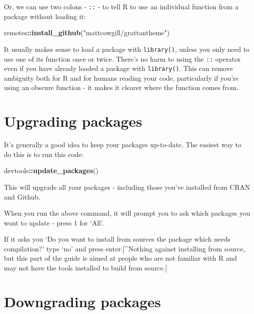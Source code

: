 \documentclass[]{book}
\newenvironment{Shaded}{\begin{snugshade}}{\end{snugshade}}
\newcommand{\KeywordTok}[1]{\textcolor[rgb]{0.13,0.29,0.53}{\textbf{#1}}}
\newcommand{\NormalTok}[1]{#1}
\newcommand{\OperatorTok}[1]{\textcolor[rgb]{0.81,0.36,0.00}{\textbf{#1}}}
\newcommand{\StringTok}[1]{\textcolor[rgb]{0.31,0.60,0.02}{#1}}
\begin{document}
Or, we can use two colons - \texttt{::} - to tell R to use an individual function from a package without loading it:

\begin{Shaded}
\begin{Highlighting}[]
\NormalTok{remotes}\OperatorTok{::}\KeywordTok{install_github}\NormalTok{(}\StringTok{"mattcowgill/grattantheme"}\NormalTok{)}
\end{Highlighting}
\end{Shaded}

It usually makes sense to load a package with \texttt{library()}, unless you only need to use one of its function once or twice. There's no harm to using the \texttt{::} operator even if you have already loaded a package with \texttt{library()}. This can remove ambiguity both for R and for humans reading your code, particularly if you're using an obscure function - it makes it clearer where the function comes from.

\hypertarget{upgrading-packages}{%
\section{Upgrading packages}\label{upgrading-packages}}

It's generally a good idea to keep your packages up-to-date. The easiest way to do this is to run this code:

\begin{Shaded}
\begin{Highlighting}[]
\NormalTok{devtools}\OperatorTok{::}\KeywordTok{update_packages}\NormalTok{()}
\end{Highlighting}
\end{Shaded}

This will upgrade all your packages - including those you've installed from CRAN and Github.

When you run the above command, it will prompt you to ask which packages you want to update - press 1 for `All'.

If it asks you `Do you want to install from sources the package which needs compilation?' type `no' and press enter.{[}\^{}Nothing against installing from source, but this part of the guide is aimed at people who are not familiar with R and may not have the tools installed to build from source.{]}

\hypertarget{downgrading-packages}{%
\section{Downgrading packages}\label{downgrading-packages}}
\end{document}
